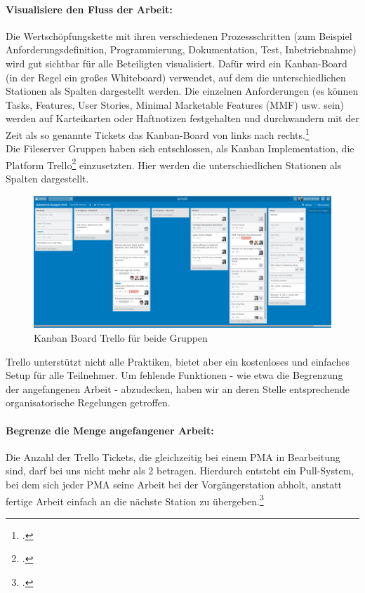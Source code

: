 \paragraph{Visualisiere den Fluss der Arbeit:}Die Wertschöpfungskette mit ihren
verschiedenen Prozessschritten (zum Beispiel Anforderungsdefinition,
Programmierung, Dokumentation, Test, Inbetriebnahme) wird gut sichtbar für alle
Beteiligten visualisiert. Dafür wird ein Kanban-Board (in der Regel ein großes
Whiteboard) verwendet, auf dem die unterschiedlichen Stationen als Spalten
dargestellt werden. Die einzelnen Anforderungen (es können Tasks, Features,
User Stories, Minimal Marketable Features (MMF) usw. sein) werden auf
Karteikarten oder Haftnotizen festgehalten und durchwandern mit der Zeit als so
genannte Tickets das Kanban-Board von links nach rechts.\footcite{wikiKanban}\\

Die Fileserver Gruppen haben sich entschlossen, als Kanban Implementation, die
Platform Trello\footcite{trelloboard} einzusetzten. Hier werden die
unterschiedlichen Stationen als Spalten dargestellt.

\begin{figure}[hbt!]
	\centering
		\includegraphics[scale=0.23]{images/trello.png}
	\caption[Screenshot des Kanban Board Trello für beide Gruppen]{Kanban Board Trello für beide Gruppen}
	\label{fig:nettop}
\end{figure}

Trello unterstützt nicht alle Praktiken, bietet aber ein kostenloses und einfaches Setup für alle Teilnehmer. Um fehlende Funktionen - wie etwa die Begrenzung der angefangenen Arbeit - abzudecken, haben wir an deren Stelle entsprechende organisatorische Regelungen getroffen.

\paragraph{Begrenze die Menge angefangener Arbeit:}Die Anzahl der Trello Tickets, die gleichzeitig bei einem PMA in Bearbeitung sind, darf bei uns nicht mehr als 2 betragen. Hierdurch entsteht ein Pull-System, bei dem sich jeder PMA seine Arbeit bei der Vorgängerstation abholt, anstatt fertige Arbeit einfach an die nächste Station zu übergeben.\footcite{wikiKanban}

